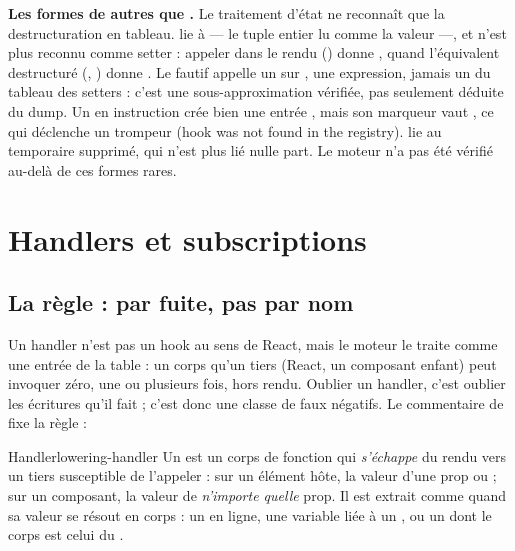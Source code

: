 \begin{piege}
\textbf{Les formes de  autres que .} Le traitement d'état ne reconnaît que la destructuration en tableau.  lie  à  --- le tuple entier lu comme la valeur ---, et  n'est plus reconnu comme setter : appeler  dans le rendu () donne , quand l'équivalent destructuré (, ) donne . Le fautif appelle un  sur , une expression, jamais un  du tableau des setters : c'est une sous-approximation vérifiée, pas seulement déduite du dump. Un  en instruction crée bien une entrée , mais son marqueur vaut , ce qui déclenche un  trompeur (\og hook  was not found in the registry\fg{}).  lie  au temporaire supprimé, qui n'est plus lié nulle part. Le moteur n'a pas été vérifié au-delà de ces formes rares.
\end{piege}

\section{Handlers et subscriptions}
\label{sec:lowering-handlers}

\subsection{La règle : par fuite, pas par nom}

Un handler n'est pas un hook au sens de React, mais le moteur le traite comme une entrée de la table : un corps qu'un tiers (React, un composant enfant) peut invoquer zéro, une ou plusieurs fois, hors rendu. Oublier un handler, c'est oublier les écritures qu'il fait ; c'est donc une classe de faux négatifs. Le commentaire de  fixe la règle :


\begin{definition}{Handler}{lowering-handler}
Un  est un corps de fonction qui \emph{s'échappe} du rendu vers un tiers susceptible de l'appeler : sur un élément hôte, la valeur d'une prop  ou  ; sur un composant, la valeur de \emph{n'importe quelle} prop. Il est extrait comme  quand sa valeur se résout en corps : un  en ligne, une variable liée à un , ou un  dont le corps est celui du .
\end{definition}

